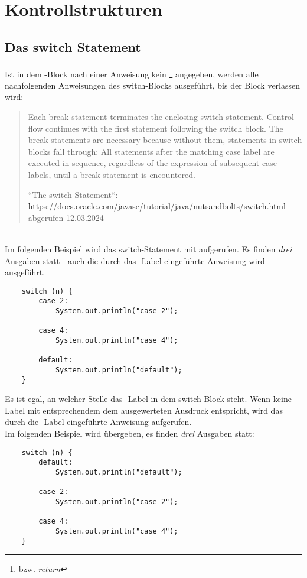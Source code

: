 \section{Kontrollstrukturen}


\subsection{Das switch Statement}

Ist in dem -Block nach einer Anweisung kein \footnote{bzw. \textit{return}} angegeben, werden alle nachfolgenden Anweisungen des switch-Blocks ausgeführt, bis der Block verlassen wird:

\blockquote[{``The switch Statement``: \url{https://docs.oracle.com/javase/tutorial/java/nutsandbolts/switch.html} - abgerufen 12.03.2024}]{
    Each break statement terminates the enclosing switch statement. Control flow continues with the first statement following the switch block. The break statements are necessary because without them, statements in switch blocks fall through: All statements after the matching case label are executed in sequence, regardless of the expression of subsequent case labels, until a break statement is encountered.
}\\

\noindent
Im folgenden Beispiel wird das switch-Statement mit  aufgerufen.
Es finden \textit{drei} Ausgaben statt - auch die durch das -Label eingeführte Anweisung wird ausgeführt.

\begin{verbatim}
    switch (n) {
        case 2:
            System.out.println("case 2");

        case 4:
            System.out.println("case 4");

        default:
            System.out.println("default");
    }
\end{verbatim}


\noindent
Es ist egal, an welcher Stelle das -Label in dem switch-Block steht.
Wenn keine -Label mit entsprechendem  dem ausgewerteten Ausdruck entspricht, wird das durch die -Label eingeführte Anweisung aufgerufen.\\

\noindent
Im folgenden Beispiel wird  übergeben, es finden \textit{drei} Ausgaben statt:

\begin{verbatim}
    switch (n) {
        default:
            System.out.println("default");

        case 2:
            System.out.println("case 2");

        case 4:
            System.out.println("case 4");
    }
\end{verbatim}
